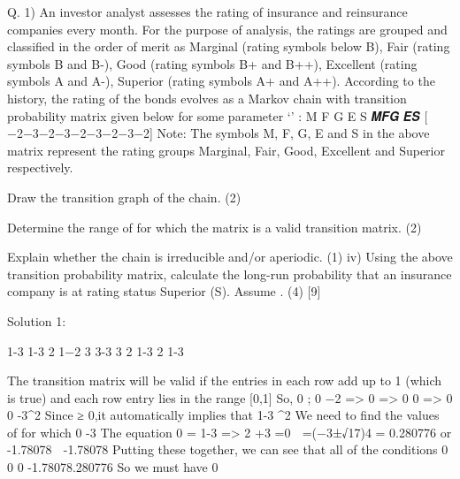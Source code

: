 
Q. 1)
An investor analyst assesses the rating of insurance and reinsurance companies every month. 
For the purpose of analysis, the ratings are grouped and classified in the order of merit as Marginal (rating symbols below B), Fair (rating symbols B and B-), Good (rating symbols B+ and B++), Excellent (rating symbols A and A-), Superior (rating symbols A+ and A++).
According to the history, the rating of the bonds evolves as a Markov chain with transition probability matrix given below for some parameter ‘\alpha ’ :
M F G E S
𝑴𝑭𝑮 𝑬𝑺 [ \alpha {}−2−3\alpha −2−3\alpha −2−3\alpha −2−3\alpha −2]
Note: The symbols M, F, G, E and S in the above matrix represent the rating groups Marginal, Fair, Good, Excellent and Superior respectively.
\item Draw the transition graph of the chain.
(2)
\item Determine the range of \alpha  for which the matrix is a valid transition matrix.
(2)
\item Explain whether the chain is irreducible and/or aperiodic.
(1)
iv) Using the above transition probability matrix, calculate the long-run probability that an insurance company is at rating status Superior (S). 
Assume .
(4)
[9]

Solution 1:
\item
1-3
1-3
2
1−2
3\alpha 
{}
3-3 3\alpha 
\alpha  {}
2
1-3 2
1-3

\item
The transition matrix will be valid if the entries in each row add up to 1 (which is true) and each row entry lies in the range [0,1]
So, 0 \leq  \alpha {};
0 −2\alpha {} => 0 \alpha {} => 0 \leq  \alpha {}
0 \alpha {} => 0 \leq  \alpha {}
0 -3\alpha ^2 
Since \alpha ≥ 0,it automatically implies that 1-3 \alpha ^2 
We need to find the values of \alpha  for which 0 -3
The equation 0 = 1-3  => 2 +3 =0
 \alpha =(−3±√17)4 = 0.280776 or -1.78078
 -1.78078\leq  \alpha  {}
Putting these together, we can see that all of the conditions
0 \leq  \alpha {}
0 \leq  \alpha {}
0 \leq  \alpha {}
-1.78078\leq  \alpha  \leq  .280776
So we must have
0 \leq  \alpha  {}


